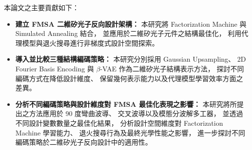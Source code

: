 本論文之主要貢獻如下：

\begin{itemize}

\item \textbf{建立 FMSA 二維矽光子反向設計架構：}
本研究將 Factorization Machine 與 Simulated Annealing 結合，
並應用於二維矽光子元件之結構最佳化，
利用代理模型與退火搜尋進行非梯度式設計空間探索。

\item \textbf{導入並比較三種結構編碼策略：}
本研究分別採用 Gaussian Upsampling、
2D Fourier Basis Encoding 與 $\beta$-VAE
作為二維矽光子結構表示方法，
探討不同編碼方式在降低設計維度、
保留幾何表示能力以及代理模型學習效率方面之差異。

\item \textbf{分析不同編碼策略與設計維度對 FMSA 最佳化表現之影響：}
本研究將所提出之方法應用於 90 度彎曲波導、
交叉波導以及模態分波解多工器，
並透過不同設計變數數量之最佳化結果，
分析設計空間維度對 Factorization Machine 學習能力、
退火搜尋行為及最終光學性能之影響，
進一步探討不同編碼策略於二維矽光子反向設計中的適用性。

\end{itemize}